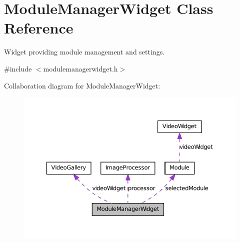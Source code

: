 \hypertarget{class_module_manager_widget}{
\section{ModuleManagerWidget Class Reference}
\label{dd/da9/class_module_manager_widget}
}


Widget providing module management and settings.  




{\ttfamily \#include $<$modulemanagerwidget.h$>$}



Collaboration diagram for ModuleManagerWidget:\nopagebreak
\begin{figure}[H]
\begin{center}
\leavevmode
\includegraphics[width=369pt]{d4/d04/class_module_manager_widget__coll__graph}
\end{center}
\end{figure}
